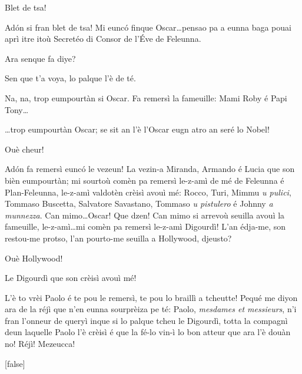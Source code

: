 \begin{drama}
\Conducteurspeaks Blet de tsa!

\Cimaspeaks Ad\'on si fran blet de tsa!  Mi eunc\'o finque Oscar\ldots pensao pa a eunna baga pouai aprì itre itoù Secretéo di Consor de l'\'Eve de Feleunna.


\Cimaspeaks Ara senque fa diye?

\Conducteurspeaks Sen que t'a voya, lo palque l'è de té.

\Cimaspeaks{} Na, na, trop eumpourtàn si Oscar. Fa remersì la fameuille: Mami Roby é Papi Tony\ldots 


\Cimaspeaks \ldots trop eumpourtàn Oscar; se sit an l'è l'Oscar eugn atro an seré lo Nobel!

\Conducteurspeaks Ouè cheur!

 \Cimaspeaks{} Ad\'on fa remersì euncó le vezeun! La vezin-a Miranda, Armando é Lucia que son bièn eumpourtàn; mi sourtoù comèn pa remersì le-z-amì de mé de Feleunna é Plan-Feleunna, le-z-amì valdotèn crèisì avouì mé: Rocco, Turi, Mimmu \textit{u pulici}, Tommaso Buscetta, Salvatore Savastano, Tommaso \textit{u pistulero} é Johnny \textit{a munnezza}. Can mimo\ldots Oscar! Que dzen! Can mimo si arrevoù seuilla avouì la fameuille, le-z-amì\ldots mi comèn pa remersì le-z-amì Digourdì! L'an édja-me, son restou-me protso, l'an pourto-me seuilla a Hollywood, djeusto?

\Conducteurspeaks Ouè Hollywood!

\Cimaspeaks Le Digourdì que son crèisì avouì mé!

\Conducteurspeaks L'è to vrèi Paolo é te pou le remersì, te pou lo braillì a tcheutte! Pequé me diyon ara de la réjì que n'en eunna sourprèiza pe té: Paolo, \textit{mesdames et messieurs}, n'i fran l'onneur de queryì inque si lo palque tcheu le Digourdì, totta la compagnì deun laquelle Paolo l'è crèisì é que la fé-lo vin-ì lo bon atteur que ara l'è douàn no! Réjì! Mezeucca!

[false]



\end{drama}
